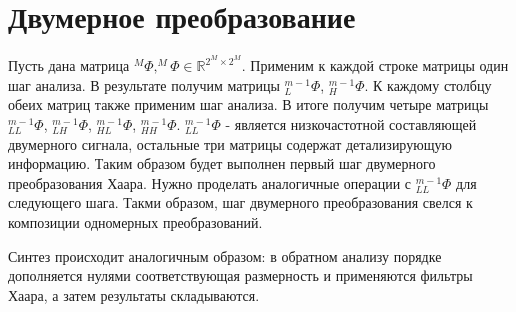 \documentclass[oneside, final, 14pt]{extreport}
\begin{document}
\section{Двумерное преобразование}
Пусть дана матрица $^{M}\Phi, ^{M}\Phi \in \mathbb{R}^{2^{M}\times2^{M}}$. Применим к каждой строке матрицы один шаг анализа. В результате получим матрицы $_L^{m-1}\Phi$, $_H^{m-1}\Phi$. К каждому столбцу обеих матриц также применим шаг анализа. В итоге получим четыре матрицы $_{LL}^{m-1}\Phi$, $_{LH}^{m-1}\Phi$, $_{HL}^{m-1}\Phi$, $_{HH}^{m-1}\Phi$. $_{LL}^{m-1}\Phi$ - является низкочастотной составляющей двумерного сигнала, остальные три матрицы содержат детализирующую информацию. Таким образом будет выполнен первый шаг двумерного преобразования Хаара. Нужно проделать аналогичные операции с $_{LL}^{m-1}\Phi$ для следующего шага. Такми образом, шаг двумерного преобразования свелся к композиции одномерных преобразований.

Синтез происходит аналогичным образом: в обратном анализу порядке дополняется нулями соответствующая размерность и применяются фильтры Хаара, а затем результаты складываются.
\end{document}
